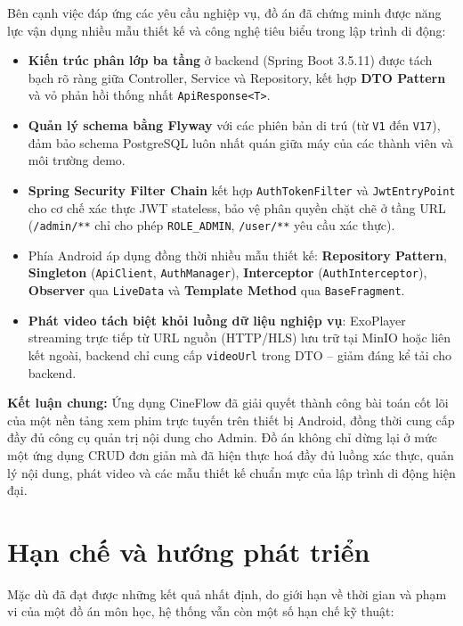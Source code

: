 Bên cạnh việc đáp ứng các yêu cầu nghiệp vụ, đồ án đã chứng minh được năng lực vận dụng nhiều mẫu thiết kế và công nghệ tiêu biểu trong lập trình di động:
\begin{itemize}
    \item \textbf{Kiến trúc phân lớp ba tầng} ở backend (Spring Boot 3.5.11) được tách bạch rõ ràng giữa Controller, Service và Repository, kết hợp \textbf{DTO Pattern} và vỏ phản hồi thống nhất \texttt{ApiResponse<T>}.
    \item \textbf{Quản lý schema bằng Flyway} với các phiên bản di trú (từ \texttt{V1} đến \texttt{V17}), đảm bảo schema PostgreSQL luôn nhất quán giữa máy của các thành viên và môi trường demo.
    \item \textbf{Spring Security Filter Chain} kết hợp \texttt{AuthTokenFilter} và \texttt{JwtEntryPoint} cho cơ chế xác thực JWT stateless, bảo vệ phân quyền chặt chẽ ở tầng URL (\texttt{/admin/**} chỉ cho phép \texttt{ROLE\_ADMIN}, \texttt{/user/**} yêu cầu xác thực).
    \item Phía Android áp dụng đồng thời nhiều mẫu thiết kế: \textbf{Repository Pattern}, \textbf{Singleton} (\texttt{ApiClient}, \texttt{AuthManager}), \textbf{Interceptor} (\texttt{AuthInterceptor}), \textbf{Observer} qua \texttt{LiveData} và \textbf{Template Method} qua \texttt{BaseFragment}.
    \item \textbf{Phát video tách biệt khỏi luồng dữ liệu nghiệp vụ}: ExoPlayer streaming trực tiếp từ URL nguồn (HTTP/HLS) lưu trữ tại MinIO hoặc liên kết ngoài, backend chỉ cung cấp \texttt{videoUrl} trong DTO -- giảm đáng kể tải cho backend.
\end{itemize}

\textbf{Kết luận chung:} Ứng dụng CineFlow đã giải quyết thành công bài toán cốt lõi của một nền tảng xem phim trực tuyến trên thiết bị Android, đồng thời cung cấp đầy đủ công cụ quản trị nội dung cho Admin. Đồ án không chỉ dừng lại ở mức một ứng dụng CRUD đơn giản mà đã hiện thực hoá đầy đủ luồng xác thực, quản lý nội dung, phát video và các mẫu thiết kế chuẩn mực của lập trình di động hiện đại.

\section{Hạn chế và hướng phát triển}
\label{sec:han_che_huong_phat_trien}

Mặc dù đã đạt được những kết quả nhất định, do giới hạn về thời gian và phạm vi của một đồ án môn học, hệ thống vẫn còn một số hạn chế kỹ thuật:

